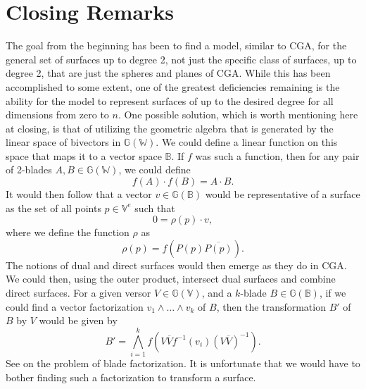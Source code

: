\documentclass{birkjour}
\theoremstyle{definition}
\theoremstyle{remark}
\numberwithin{equation}{section}
\newcommand{\G}{\mathbb{G}}
\newcommand{\V}{\mathbb{V}}
\newcommand{\W}{\mathbb{W}}
\newcommand{\B}{\mathbb{B}}
\begin{document}
\section{Closing Remarks}

The goal from the beginning has been to find a model, similar
to CGA, for the general set of surfaces up to degree 2,
not just the specific class of surfaces, up to degree 2, that are just the spheres and planes of CGA.
While this has been accomplished to some extent, one of the greatest deficiencies
remaining is the ability for the model to represent surfaces of up to the desired degree for
all dimensions from zero to $n$.
One possible solution, which is worth mentioning here at closing, is that of utilizing the geometric
algebra that is generated by the linear space of bivectors in $\G(\W)$.  We could
define a linear function on this space that maps it to a vector space $\B$.  If $f$ was such
a function, then for any pair of 2-blades $A,B\in\G(\W)$, we could define
\begin{equation}
f(A)\cdot f(B)=A\cdot B.
\end{equation}
It would then follow that a vector $v\in\G(\B)$ would be
representative of a surface as the set of all points $p\in\V^e$ such that
\begin{equation}
0 = \rho(p)\cdot v,
\end{equation}
where we define the function $\rho$ as
\begin{equation}
\rho(p) = f(P(p)\overline{P(p)}).
\end{equation}
The notions of dual and direct surfaces
would then emerge as they do in CGA.  We could then, using the outer product,
intersect dual surfaces and combine direct surfaces.  For a given versor $V\in\G(\V)$,
and a $k$-blade $B\in\G(\B)$, if we could find a vector factorization $v_1\wedge\dots\wedge v_k$
of $B$, then the transformation $B'$ of $B$ by $V$ would be given by
\begin{equation}
B' = \bigwedge_{i=1}^k f(V\overline{V}f^{-1}(v_i)(V\overline{V})^{-1}).
\end{equation}
See \cite{} on the problem of blade factorization.  It is unfortunate that we would
have to bother finding such a factorization to transform a surface.
\end{document}
